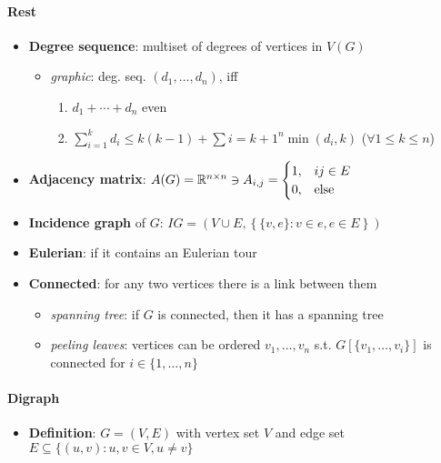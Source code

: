 \paragraph{Rest}
\begin{itemize}
  \item \textbf{Degree sequence}: multiset of degrees of vertices in $ V(G) $
  \begin{itemize}
    \item \emph{graphic}: deg. seq. $ (d_1, \dots, d_n) $, iff
    \begin{enumerate}
       \item $ d_1 + \cdots + d_n $ even
       \item $ \sum_{i=1}^k d_i \leq k(k-1) + \sum{i = k+1}^n \min(d_i,k) $ \quad ($ \forall 1 \leq k \leq n $)
     \end{enumerate} 
  \end{itemize}
  \item \textbf{Adjacency matrix}: $ A(G) = \mathbb{R}^{n \times n} \ni A_{i,j} = \begin{cases}
    1, & ij \in E \\
    0, & \text{else}
  \end{cases} $
  \item \textbf{Incidence graph} of $ G $: $ IG = (V \cup E, \left\{ \{ v,e \} : v \in e, e \in E \right\}) $
  \item \textbf{Eulerian}: if it contains an Eulerian tour
  \item \textbf{Connected}: for any two vertices there is a link between them
  \begin{itemize}
    \item \emph{spanning tree}: if $ G $ is connected, then it has a spanning tree
    \item \emph{peeling leaves}: vertices can be ordered $ v_1, \dots, v_n $ s.t. $ G[\{ v_1, \dots, v_i \}] $ is connected for $ i \in \{ 1, \dots, n \} $
  \end{itemize}
\end{itemize}

\paragraph{Digraph}
\begin{itemize}
  \item \textbf{Definition}: $ G = (V,E) $ with vertex set $ V $ and edge set $ E \subseteq \{ (u,v) : u,v \in V, u \neq v \} $
\end{itemize}


